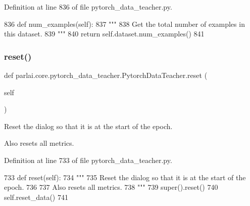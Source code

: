 Definition at line 836 of file pytorch\+\_\+data\+\_\+teacher.\+py.


\begin{DoxyCode}
836     \textcolor{keyword}{def }num\_examples(self):
837         \textcolor{stringliteral}{"""}
838 \textcolor{stringliteral}{        Get the total number of examples in this dataset.}
839 \textcolor{stringliteral}{        """}
840         \textcolor{keywordflow}{return} self.dataset.num\_examples()
841 
\end{DoxyCode}
\mbox{\label{classparlai_1_1core_1_1pytorch__data__teacher_1_1PytorchDataTeacher_a568fb8e02997d9662be51a205d0ea886}} 
\subsubsection{\texorpdfstring{reset()}{reset()}}
{\footnotesize\ttfamily def parlai.\+core.\+pytorch\+\_\+data\+\_\+teacher.\+Pytorch\+Data\+Teacher.\+reset (\begin{DoxyParamCaption}\item[{}]{self }\end{DoxyParamCaption})}

\begin{DoxyVerb}Reset the dialog so that it is at the start of the epoch.

Also resets all metrics.
\end{DoxyVerb}
 

Definition at line 733 of file pytorch\+\_\+data\+\_\+teacher.\+py.


\begin{DoxyCode}
733     \textcolor{keyword}{def }reset(self):
734         \textcolor{stringliteral}{"""}
735 \textcolor{stringliteral}{        Reset the dialog so that it is at the start of the epoch.}
736 \textcolor{stringliteral}{}
737 \textcolor{stringliteral}{        Also resets all metrics.}
738 \textcolor{stringliteral}{        """}
739         super().reset()
740         self.reset\_data()
741 
\end{DoxyCode}
\mbox{\label{classparlai_1_1core_1_1pytorch__data__teacher_1_1PytorchDataTeacher_aaf9f8b1b0b358832d16f917c598151fa}} 
